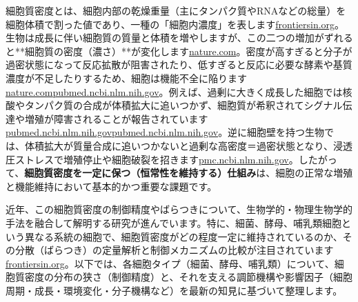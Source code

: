 細胞質密度とは、細胞内部の乾燥重量（主にタンパク質やRNAなどの総量）を細胞体積で割った値であり、一種の「細胞内濃度」を表します\href{https://www.frontiersin.org/journals/cell-and-developmental-biology/articles/10.3389/fcell.2022.1017499/full\#:~:text=size\%20control,cells\%2C\%20that\%20is\%2C\%20significantly\%20tighter}{frontiersin.org}。生物は成長に伴い細胞質の質量と体積を増やしますが、この二つの増加がずれると**細胞質の密度（濃さ）**が変化します\href{https://www.nature.com/articles/s42003-022-03348-2\#:~:text=Single,link\%20between\%20the\%20levels\%20of}{nature.com}。密度が高すぎると分子が過密状態になって反応拡散が阻害されたり、低すぎると反応に必要な酵素や基質濃度が不足したりするため、細胞は機能不全に陥ります\href{https://www.nature.com/articles/s42003-022-03348-2\#:~:text=differentiation\%20yields\%20a\%20density\%20homeostasis,the\%20\%E2\%80\%9Cinvisible\%E2\%80\%9D\%20microfluidic\%20arrays\%20that}{nature.com}\href{https://pubmed.ncbi.nlm.nih.gov/30739799/\#:~:text=impairs\%20gene\%20induction\%2C\%20cell,loss\%20of\%20scaling\%20beyond\%20a}{pubmed.ncbi.nlm.nih.gov}。例えば、過剰に大きく成長した細胞では核酸やタンパク質の合成が体積拡大に追いつかず、細胞質が希釈されてシグナル伝達や増殖が障害されることが報告されています\href{https://pubmed.ncbi.nlm.nih.gov/30739799/\#:~:text=impairs\%20gene\%20induction\%2C\%20cell,loss\%20of\%20scaling\%20beyond\%20a}{pubmed.ncbi.nlm.nih.gov}\href{https://pubmed.ncbi.nlm.nih.gov/30739799/\#:~:text=that\%20growing\%20budding\%20yeast\%20and,outside\%20these\%20bounds\%20contribute\%20to}{pubmed.ncbi.nlm.nih.gov}。逆に細胞壁を持つ生物では、体積拡大が質量合成に追いつかないと過剰な高密度＝過密状態となり、浸透圧ストレスで増殖停止や細胞破裂を招きます\href{https://pmc.ncbi.nlm.nih.gov/articles/PMC11065075/\#:~:text=In\%20bacteria\%2C\%20algae\%2C\%20fungi\%2C\%20and,density\%20remains\%20constant\%20across\%20a}{pmc.ncbi.nlm.nih.gov}。したがって、\textbf{細胞質密度を一定に保つ（恒常性を維持する）仕組み}は、細胞の正常な増殖と機能維持において基本的かつ重要な課題です。

近年、この細胞質密度の制御精度やばらつきについて、生物学的・物理生物学的手法を融合して解明する研究が進んでいます。特に、細菌、酵母、哺乳類細胞という異なる系統の細胞で、細胞質密度がどの程度一定に維持されているのか、その分散（ばらつき）の定量解析と制御メカニズムの比較が注目されています\href{https://www.frontiersin.org/journals/cell-and-developmental-biology/articles/10.3389/fcell.2022.1017499/full\#:~:text=density\%2C\%20which\%20is\%20simply\%20computed,extraordinary\%20stability\%20of\%20cellular\%20mass}{frontiersin.org}。以下では、各細胞タイプ（細菌、酵母、哺乳類）について、細胞質密度の分布の狭さ（制御精度）と、それを支える調節機構や影響因子（細胞周期・成長・環境変化・分子機構など）を最新の知見に基づいて整理します。

